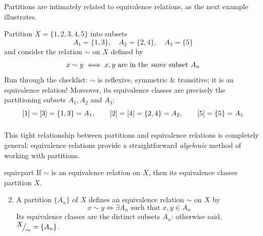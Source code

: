 

Partitions are intimately related to equivalence relations, as the next example illustrates.

\begin{example}{}{}
	Partition $X=\{1,2,3,4,5\}$ into subsets
	\[
		A_1=\{1,3\},\quad A_2=\{2,4\},\quad A_3=\{5\}
	\]
	and consider the relation $\sim$ on $X$ defined by\footnotemark
	\[
		x\sim y\iff \text{$x,y$ are in the \emph{same} subset $A_n$}
	\]
	Run through the checklist: $\sim$ is reflexive, symmetric \& transitive; it is an equivalence relation! Moreover, its equivalence classes are precisely the partitioning subsets $A_1,A_2$ and $A_3$:
	\[
		[1]=[3]=\{1,3\}=A_1,\qquad [2]=[4]=\{2,4\}=A_2,\qquad [5]=\{5\}=A_5 \rule[-10pt]{0pt}{10pt}
	\]
\end{example} 



\vspace*{-10pt}

\goodbreak


This tight relationship between partitions and equivalence relations is completely general: equivalence relations provide a straightforward \emph{algebraic} method of working with partitions.

\begin{thm}{}{equivpart}
	\exstart If $\sim$ is an equivalence relation on $X$, then its equivalence classes partition $X$.
	\begin{enumerate}\setcounter{enumi}{1}
		\item A partition $\{A_n\}$ of $X$ defines an equivalence relation $\sim$ on $X$ by
		\[
			x\sim y\iff \exists A_n\text{ such that }x,y\in A_n
		\]
		Its equivalence classes are the distinct subsets $A_n$: otherwise said, $\smash[t]{{}^{\textstyle {X}}\!\big/_{\textstyle \!{\sim}}}=\{A_n\}$.
	\end{enumerate}
\end{thm}

